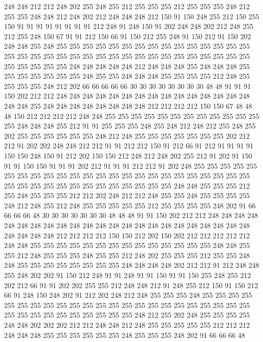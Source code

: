 248 248 212 212 248 202 255 248 255 212 255 255 255 212 255 255 255 248 212 255
255 248 248 212 248 202 212 248 248 248 212 150 91 150 248 255 212 150 255 150
91 91 91 91 91 91 91 91 212 248 91 248 150 91 202 248 248 202 212 248
255 212 255 248 150 67 91 91 212 150 66 91 150 212 255 248 91 150 212 91
150 202 248 248 255 248 255 255 255 255 255 255 255 255 255 255 255 255 255 255
255 255 255 255 255 255 255 255 255 255 255 255 255 255 255 255 255 255 255 255
255 255 255 255 255 248 248 248 248 248 212 248 248 248 255 248 248 248 255 255
255 255 255 255 255 248 255 255 248 248 248 255 255 255 255 212 248 255 255 255
255 248 212 202 66 66 66 66 66 30 30 30 30 30 30 30 30 48 48 91
91 91 150 202 212 212 248 248 248 248 248 248 248 248 248 248 248 248 248 248
248 248 248 255 248 248 248 248 248 248 248 248 212 212 212 212 150 150 67 48
48 48 150 212 212 212 212 248 248 255 255 255 255 255 255 255 255 255 255 255
255 255 248 248 248 255 212 91 91 255 255 255 248 255 248 212 248 212 255 248
255 202 255 255 255 255 255 255 248 212 248 255 255 255 255 255 255 255 202 212
212 91 202 202 248 248 212 212 91 91 212 212 150 91 212 66 91 212 91 91
91 91 150 150 248 150 91 212 202 150 150 212 248 212 248 202 255 212 91 202
91 150 91 91 150 150 91 91 91 202 212 91 91 91 212 212 91 202 248 255
255 255 255 255 255 255 255 255 255 255 255 255 255 255 255 255 255 255 255 255
255 255 255 255 255 255 255 255 255 255 255 255 255 255 255 255 248 248 255 255
255 212 255 248 255 255 255 212 212 202 248 212 212 248 255 255 248 255 255 255
255 248 212 248 255 212 248 255 255 255 255 255 212 255 255 255 255 248 202 91
66 66 66 66 48 30 30 30 30 30 30 30 48 48 48 91 91 150 202 212
212 248 248 248 248 248 248 248 248 248 248 248 248 248 248 248 248 248 248 248
248 248 248 248 248 248 248 248 212 212 212 212 150 150 212 202 150 202 212 212
212 212 212 248 248 255 255 255 255 255 255 255 255 255 255 255 255 255 255 248
248 255 255 212 248 255 255 255 248 255 255 212 248 202 255 255 255 212 255 255
248 248 255 255 255 255 255 255 255 255 248 248 248 248 202 212 212 91 212 248
248 255 248 202 202 91 150 212 248 91 91 248 91 91 150 91 91 150 255 248
255 212 202 212 66 91 91 202 202 255 255 212 248 248 212 91 248 255 212 150
91 150 212 66 91 248 150 248 202 91 212 202 248 212 248 255 255 255 248 255
255 255 255 255 255 255 255 255 255 255 255 255 255 255 255 255 255 255 255 255
255 255 255 255 255 255 255 255 255 255 255 255 248 212 255 202 248 255 255 255
255 248 248 202 202 202 212 212 248 248 212 248 255 255 255 255 255 212 212 212
248 248 248 255 255 255 255 255 255 248 255 255 255 248 202 91 66 66 66 48
